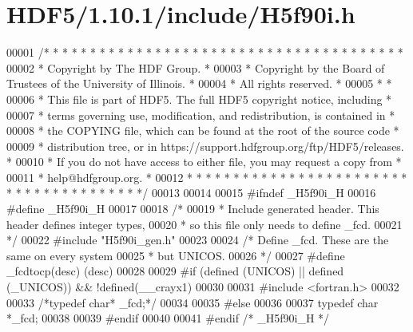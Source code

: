 \hypertarget{_h_d_f5_21_810_81_2include_2_h5f90i_8h_source}{}\section{H\+D\+F5/1.10.1/include/\+H5f90i.h}
\label{_h_d_f5_21_810_81_2include_2_h5f90i_8h_source}

\begin{DoxyCode}
00001 \textcolor{comment}{/* * * * * * * * * * * * * * * * * * * * * * * * * * * * * * * * * * * * * * *}
00002 \textcolor{comment}{ * Copyright by The HDF Group.                                               *}
00003 \textcolor{comment}{ * Copyright by the Board of Trustees of the University of Illinois.         *}
00004 \textcolor{comment}{ * All rights reserved.                                                      *}
00005 \textcolor{comment}{ *                                                                           *}
00006 \textcolor{comment}{ * This file is part of HDF5.  The full HDF5 copyright notice, including     *}
00007 \textcolor{comment}{ * terms governing use, modification, and redistribution, is contained in    *}
00008 \textcolor{comment}{ * the COPYING file, which can be found at the root of the source code       *}
00009 \textcolor{comment}{ * distribution tree, or in https://support.hdfgroup.org/ftp/HDF5/releases.  *}
00010 \textcolor{comment}{ * If you do not have access to either file, you may request a copy from     *}
00011 \textcolor{comment}{ * help@hdfgroup.org.                                                        *}
00012 \textcolor{comment}{ * * * * * * * * * * * * * * * * * * * * * * * * * * * * * * * * * * * * * * */}
00013 
00014 
00015 \textcolor{preprocessor}{#ifndef \_H5f90i\_H}
00016 \textcolor{preprocessor}{#define \_H5f90i\_H}
00017 
00018 \textcolor{comment}{/*}
00019 \textcolor{comment}{ * Include generated header.  This header defines integer types,}
00020 \textcolor{comment}{ * so this file only needs to define \_fcd.}
00021 \textcolor{comment}{ */}
00022 \textcolor{preprocessor}{#include "H5f90i\_gen.h"}
00023 
00024 \textcolor{comment}{/* Define \_fcd.  These are the same on every system}
00025 \textcolor{comment}{ * but UNICOS.}
00026 \textcolor{comment}{ */}
00027 \textcolor{preprocessor}{#define \_fcdtocp(desc) (desc)}
00028 
00029 \textcolor{preprocessor}{#if (defined (UNICOS) || defined (\_UNICOS)) && !defined(\_\_crayx1)}
00030 
00031 \textcolor{preprocessor}{#include <fortran.h>}
00032 
00033 \textcolor{comment}{/*typedef char*              \_fcd;*/}
00034 
00035 \textcolor{preprocessor}{#else}
00036 
00037 \textcolor{keyword}{typedef} \textcolor{keywordtype}{char}              *\_fcd;
00038 
00039 \textcolor{preprocessor}{#endif}
00040 
00041 \textcolor{preprocessor}{#endif }\textcolor{comment}{/* \_H5f90i\_H */}\textcolor{preprocessor}{}
\end{DoxyCode}
